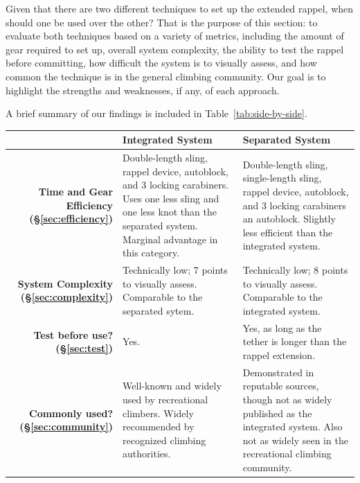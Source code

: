 \documentclass[nonacm,acmtog]{acmart}
\begin{document}
   Given that there are two different techniques to set up the extended rappel,
   when should one be used over the other?  That is the purpose of this
   section: to evaluate both techniques based on a variety of metrics,
   including the amount of gear required to set up, overall system complexity,
   the ability to test the rappel before committing, how difficult the system
   is to visually assess, and how common the technique is in the general
   climbing community.  Our goal is to highlight the strengths and weaknesses,
   if any, of each approach.

   A brief summary of our findings is included in Table~\ref{tab:side-by-side}.

   \begin{table}
      \centering
      \begin{tabular}{|rp{2.25in}p{2.25in}|}
      \hline
         &
         {\bf Integrated System} &
         {\bf Separated System}  \\

      \hline
         {\bf Time and Gear Efficiency (\S\ref{sec:efficiency})} &
            Double-length sling, rappel device, autoblock, and 3 locking
               carabiners.  Uses one less sling and one less knot than the
               separated system.  Marginal advantage in this category.
               \vspace{0.1in} &
            Double-length sling, single-length sling, rappel device, autoblock,
               and 3 locking carabiners an autoblock.  Slightly less efficient
               than the integrated system. \\

         {\bf System Complexity (\S\ref{sec:complexity})} &
            Technically low; 7 points to visually assess.  Comparable to the
               separated sytem. &
            Technically low; 8 points to visually assess.  Comparable to the
               integrated system.
               \vspace{0.1in} \\

         {\bf Test before use? (\S\ref{sec:test})} &
            Yes. &
            Yes, as long as the tether is longer than the rappel extension.
            \vspace{0.1in} \\

         {\bf Commonly used? (\S\ref{sec:community})} &
            Well-known and widely used by recreational climbers.  Widely
               recommended by recognized climbing authorities. &
            Demonstrated in reputable sources, though not as widely published
               as the integrated system.  Also not as widely seen in the
               recreational climbing community.
               \vspace{0.1in} \\


\end{tabular}
\end{table}
\end{document}
